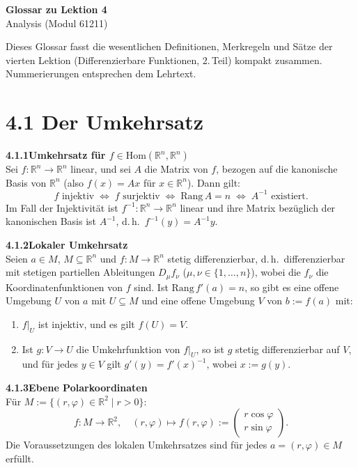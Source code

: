 \documentclass[a4paper,12pt]{article}
\newcommand{\gentry}[3]{%
  \noindent\textbf{#1\quad #2}\nopagebreak\\[0.2em]
  #3\par\smallskip
}
\begin{document}
\begin{center}
  {\LARGE\bfseries Glossar zu Lektion 4}\\[0.5em]
  {\large Analysis (Modul 61211)}
\end{center}

\vspace{1em}

Dieses Glossar fasst die wesentlichen Definitionen, Merkregeln und Sätze der
vierten Lektion (Differenzierbare Funktionen, 2.\,Teil) kompakt zusammen.
Nummerierungen entsprechen dem Lehrtext.

\section*{4.1 \quad Der Umkehrsatz}

\gentry{4.1.1}{Umkehrsatz für $f \in \mathrm{Hom}(\mathbb{R}^n, \mathbb{R}^n)$}{%
  Sei $f: \mathbb{R}^n \to \mathbb{R}^n$ linear, und sei $A$ die Matrix von $f$, bezogen auf
  die kanonische Basis von $\mathbb{R}^n$ (also $f(x) = Ax$ für $x \in \mathbb{R}^n$). Dann gilt:
  \[
    f \text{ injektiv} \;\Leftrightarrow\; f \text{ surjektiv} \;\Leftrightarrow\;
    \mathrm{Rang}\,A = n \;\Leftrightarrow\; A^{-1} \text{ existiert.}
  \]
  Im Fall der Injektivität ist $f^{-1}: \mathbb{R}^n \to \mathbb{R}^n$ linear und ihre
  Matrix bezüglich der kanonischen Basis ist $A^{-1}$, d.\,h.\ $f^{-1}(y) = A^{-1}y$.
}

\gentry{4.1.2}{Lokaler Umkehrsatz}{%
  Seien $a \in M$, $M \subseteq \mathbb{R}^n$ und $f: M \to \mathbb{R}^n$ stetig differenzierbar,
  d.\,h.\ differenzierbar mit stetigen partiellen Ableitungen $D_\mu f_\nu$
  ($\mu, \nu \in \{1, \ldots, n\}$), wobei die $f_\nu$ die Koordinatenfunktionen von $f$ sind.
  Ist $\mathrm{Rang}\,f'(a) = n$, so gibt es eine offene Umgebung $U$ von $a$ mit $U \subseteq M$
  und eine offene Umgebung $V$ von $b := f(a)$ mit:
  \begin{enumerate}[label=(\roman*),topsep=2pt,itemsep=1pt]
    \item $f|_U$ ist injektiv, und es gilt $f(U) = V$.
    \item Ist $g: V \to U$ die Umkehrfunktion von $f|_U$, so ist $g$ stetig differenzierbar auf $V$,
          und für jedes $y \in V$ gilt $g'(y) = f'(x)^{-1}$, wobei $x := g(y)$.
  \end{enumerate}
}

\gentry{4.1.3}{Ebene Polarkoordinaten}{%
  Für $M := \{(r, \varphi) \in \mathbb{R}^2 \mid r > 0\}$:
  \[
    f: M \to \mathbb{R}^2, \quad (r, \varphi) \mapsto f(r, \varphi) := \begin{pmatrix} r\cos\varphi \\ r\sin\varphi \end{pmatrix}.
  \]
  Die Voraussetzungen des lokalen Umkehrsatzes sind für jedes $a = (r, \varphi) \in M$ erfüllt.
}
\end{document}
